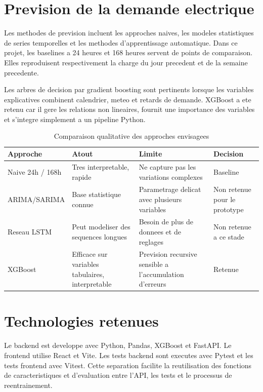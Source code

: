 \documentclass[12pt,a4paper,oneside]{report}
\begin{document}
\section{Prevision de la demande electrique}
Les methodes de prevision incluent les approches naives, les modeles statistiques de series temporelles et les methodes d'apprentissage automatique. Dans ce projet, les baselines a 24 heures et 168 heures servent de points de comparaison. Elles reproduisent respectivement la charge du jour precedent et de la semaine precedente.

Les arbres de decision par gradient boosting sont pertinents lorsque les variables explicatives combinent calendrier, meteo et retards de demande. XGBoost a ete retenu car il gere les relations non lineaires, fournit une importance des variables et s'integre simplement a un pipeline Python.

\begin{table}[H]
\centering
\caption{Comparaison qualitative des approches envisagees}
\begin{tabular}{>{\raggedright\arraybackslash}p{3cm}>{\raggedright\arraybackslash}p{3cm}>{\raggedright\arraybackslash}p{3cm}>{\raggedright\arraybackslash}p{3cm}}
\toprule
Approche & Atout & Limite & Decision\\
\midrule
Naive 24h / 168h & Tres interpretable, rapide & Ne capture pas les variations complexes & Baseline\\
ARIMA/SARIMA & Base statistique connue & Parametrage delicat avec plusieurs variables & Non retenue pour le prototype\\
Reseau LSTM & Peut modeliser des sequences longues & Besoin de plus de donnees et de reglages & Non retenue a ce stade\\
XGBoost & Efficace sur variables tabulaires, interpretable & Prevision recursive sensible a l'accumulation d'erreurs & Retenue\\
\bottomrule
\end{tabular}
\end{table}

\section{Technologies retenues}
Le backend est developpe avec Python, Pandas, XGBoost et FastAPI. Le frontend utilise React et Vite. Les tests backend sont executes avec Pytest et les tests frontend avec Vitest. Cette separation facilite la reutilisation des fonctions de caracteristiques et d'evaluation entre l'API, les tests et le processus de reentrainement.
\end{document}

